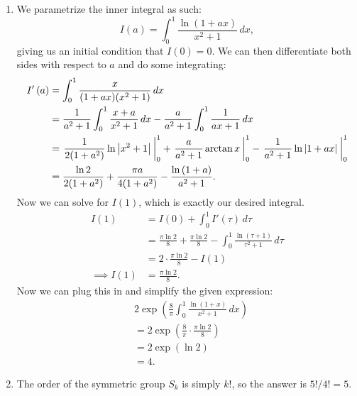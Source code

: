 \begin{enumerate}
    \item We parametrize the inner integral as such:
        \[
            I \left( a \right) = \int_{ 0 }^{ 1 } \frac{\ln{\left( 1 + ax \right)}}{x^2 + 1} \, dx
        ,\]
        giving us an initial condition that \( I \left( 0 \right) = 0 \). We
        can then differentiate both sides with respect to \( a \) and do some
        integrating:
        \begin{align*}
            I' \left( a \right) &= \int_{ 0 }^{ 1 } \frac{x}{( 1 + ax ) ( x^2 + 1 )} \, dx \\
            &= \frac{1}{a^2 + 1} \int_{ 0 }^{ 1 } \frac{x + a}{x^2 + 1} \, dx - \frac{a}{a^2 + 1} \int_{ 0 }^{ 1 } \frac{1}{ax + 1} \, dx \\
            &= \bounds{\frac{1}{2 ( 1 + a^2 )} \ln{\abs{x^2 + 1}}}{0}{1} + \bounds{\frac{a}{a^2 + 1} \arctan{x}}{0}{1} - \bounds{\frac{1}{a^2 + 1} \ln{\abs{1 + ax}}}{0}{1} \\
            &= \frac{\ln{2}}{2 (1 + a^2)} + \frac{\pi a}{4 (1 + a^2)} - \frac{\ln{\left( 1 + a \right)}}{a^2 + 1}
        .\end{align*}
        Now we can solve for \( I \left( 1 \right) \), which is exactly our
        desired integral. 
        \begin{align*}
            I \left( 1 \right) &= I \left( 0 \right) + \int_{ 0 }^{ 1 } I' \left( \tau \right) \, d\tau \\
            &= \frac{\pi \ln{2}}{8} + \frac{\pi \ln{2}}{8} - \int_{ 0 }^{ 1 } \frac{\ln{\left( \tau + 1 \right)}}{\tau^2 + 1} \, d\tau \\
            &= 2 \cdot \frac{\pi \ln{2}}{8} - I \left( 1 \right) \\
            \implies I \left( 1 \right) &= \frac{\pi \ln{2}}{8}
        .\end{align*}
        Now we can plug this in and simplify the given expression:
        \begin{align*}
            &2 \exp{\left( \frac{8}{\pi} \int_{ 0 }^{ 1 } \frac{\ln{\left( 1 + x \right)}}{x^2 + 1} \, dx \right)} \\
            &= 2 \exp{\left( \frac{8}{\pi} \cdot \frac{\pi \ln{2}}{8} \right)} \\
            &= 2 \exp{\left( \ln{2} \right)} \\
            &= \boxed{4}
        .\end{align*}

    \item The order of the symmetric group \( S_k \) is simply \( k! \), so the answer is \( 5!/4! = \boxed{5} \).


\end{enumerate}
